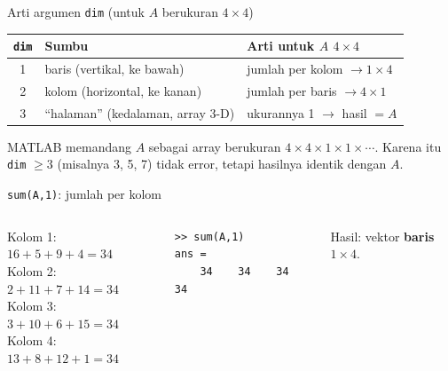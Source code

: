 \documentclass[aspectratio=169,11pt]{beamer}
\begin{document}
\begin{frame}{Arti argumen \texttt{dim} (untuk $A$ berukuran $4\times4$)}
\centering
\renewcommand{\arraystretch}{1.3}
\begin{tabular}{c l l}
\toprule
\texttt{dim} & Sumbu & Arti untuk $A$ $4\times4$ \\
\midrule
1 & baris (vertikal, ke bawah)        & jumlah per \textcolor{kolom}{kolom} $\rightarrow 1\times4$ \\
2 & kolom (horizontal, ke kanan)      & jumlah per \textcolor{baris}{baris} $\rightarrow 4\times1$ \\
3 & ``halaman'' (kedalaman, array 3-D) & ukurannya 1 $\rightarrow$ hasil $= A$ \\
\bottomrule
\end{tabular}

\vspace{1em}
\small\raggedright
MATLAB memandang $A$ sebagai array berukuran $4\times4\times1\times1\times\cdots$.
Karena itu \texttt{dim} $\ge 3$ (misalnya 3, 5, 7) tidak error, tetapi
hasilnya identik dengan $A$.
\end{frame}

\begin{frame}[fragile]{\texttt{sum(A,1)}: jumlah per kolom}
\begin{columns}[c]
\centering
{}
\small
Kolom 1: $16+5+9+4 = 34$\\
Kolom 2: $2+11+7+14 = 34$\\
Kolom 3: $3+10+6+15 = 34$\\
Kolom 4: $13+8+12+1 = 34$
\begin{lstlisting}
>> sum(A,1)
ans =
    34    34    34    34
\end{lstlisting}
Hasil: vektor \textbf{baris} $1\times4$.
\end{columns}
\end{frame}
\end{document}
